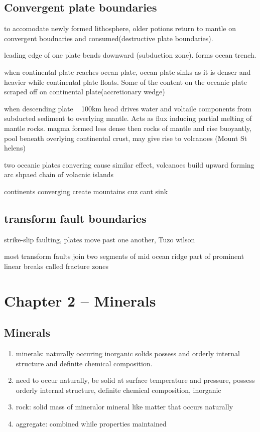 \documentclass[11pt]{amsart}
\begin{document}
  \subsection{Convergent plate boundaries}
  \par to accomodate newly formed lithosphere, older potions return to
  mantle on convergent boudnaries and consumed(destructive plate
  boundaries).
  \par leading edge of one plate bends downward (subduction zone). forms
  ocean trench.
  \par when continental plate reaches ocean plate, ocean plate sinks as it
  is denser and heavier while continental plate floats. Some of the
  content on the oceanic plate scraped off on continental
  plate(accretionary wedge)
  \par when descending plate ~ 100km head drives water and voltaile
  components from subducted sediment to overlying mantle. Acts as flux
  inducing partial melting of mantle rocks. magma formed less dense then
  rocks of mantle and rise buoyantly, pool beneath overlying continental
  crust, may give rise to volcanoes (Mount St helens)
  \par two oceanic plates convering cause similar effect, volcanoes build
  upward forming arc shpaed chain of volacnic islands
  \par continents converging create mountains cuz cant sink
  \subsection{transform fault boundaries}
  \par strike-slip faulting, plates move past one another, Tuzo wilson
  \par most transform faults join two segments of mid ocean ridge part of
  prominent linear breaks called fracture zones
  \section{Chapter 2 -- Minerals}
  \subsection{Minerals}
  \begin{enumerate}
    \item minerals: naturally occuring inorganic solids possess and
      orderly internal structure and definite chemical composition.
    \item need to occur naturally, be solid at surface temperature and
      pressure, possess orderly internal structure, definite chemical
      composition, inorganic
    \item rock: solid mass of mineralor mineral like matter that occurs
      naturally
    \item aggregate: combined while properties maintained
  \end{enumerate}
\end{document}

